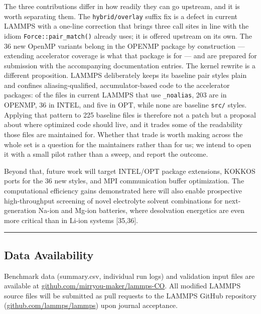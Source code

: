 \documentclass[
  11pt,
]{article}
\newcounter{none} %
\begin{document}
The three contributions differ in how readily they can go upstream, and
it is worth separating them. The \texttt{hybrid/overlay} suffix fix is a
defect in current LAMMPS with a one-line correction that brings three
call sites in line with the idiom \texttt{Force::pair\_match()} already
uses; it is offered upstream on its own. The 36 new OpenMP variants
belong in the OPENMP package by construction --- extending accelerator
coverage is what that package is for --- and are prepared for submission
with the accompanying documentation entries. The kernel rewrite is a
different proposition. LAMMPS deliberately keeps its baseline pair
styles plain and confines aliasing-qualified, accumulator-based code to
the accelerator packages: of the files in current LAMMPS that use
\texttt{\_noalias}, 203 are in OPENMP, 36 in INTEL, and five in OPT,
while none are baseline \texttt{src/} styles. Applying that pattern to
225 baseline files is therefore not a patch but a proposal about where
optimized code should live, and it trades some of the readability those
files are maintained for. Whether that trade is worth making across the
whole set is a question for the maintainers rather than for us; we
intend to open it with a small pilot rather than a sweep, and report the
outcome.

Beyond that, future work will target INTEL/OPT package extensions,
KOKKOS ports for the 36 new styles, and MPI communication buffer
optimization. The computational efficiency gains demonstrated here will
also enable prospective high-throughput screening of novel electrolyte
solvent combinations for next-generation Na-ion and Mg-ion batteries,
where desolvation energetics are even more critical than in Li-ion
systems {[}35,36{]}.

\begin{center}\rule{0.5\linewidth}{0.5pt}\end{center}

\subsection{Data Availability}\label{data-availability}

Benchmark data (summary.csv, individual run logs) and validation input
files are available at
\href{https://github.com/mirryou-maker/lammps-CO}{github.com/mirryou-maker/lammps-CO}.
All modified LAMMPS source files will be submitted as pull requests to
the LAMMPS GitHub repository
(\href{https://github.com/lammps/lammps}{github.com/lammps/lammps}) upon
journal acceptance.
\end{document}
